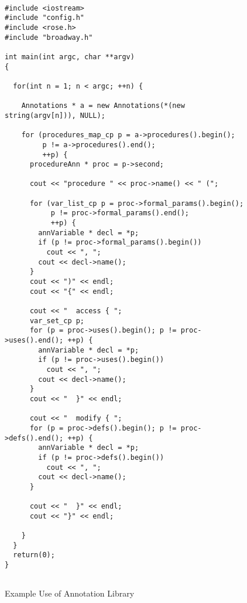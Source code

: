 \documentclass[times, 10pt]{article}
\begin{document}
\begin{figure}
\begin{verbatim}

#include <iostream> 
#include "config.h" 
#include <rose.h> 
#include "broadway.h" 
 
int main(int argc, char **argv) 
{ 
 
  for(int n = 1; n < argc; ++n) { 
 
    Annotations * a = new Annotations(*(new string(argv[n])), NULL); 
 
    for (procedures_map_cp p = a->procedures().begin(); 
         p != a->procedures().end(); 
         ++p) { 
      procedureAnn * proc = p->second; 
 
      cout << "procedure " << proc->name() << " ("; 
       
      for (var_list_cp p = proc->formal_params().begin(); 
           p != proc->formal_params().end(); 
           ++p) { 
        annVariable * decl = *p; 
        if (p != proc->formal_params().begin()) 
          cout << ", "; 
        cout << decl->name(); 
      } 
      cout << ")" << endl; 
      cout << "{" << endl; 
       
      cout << "  access { "; 
      var_set_cp p;
      for (p = proc->uses().begin(); p != proc->uses().end(); ++p) { 
        annVariable * decl = *p; 
        if (p != proc->uses().begin()) 
          cout << ", "; 
        cout << decl->name(); 
      } 
      cout << "  }" << endl; 
       
      cout << "  modify { "; 
      for (p = proc->defs().begin(); p != proc->defs().end(); ++p) { 
        annVariable * decl = *p; 
        if (p != proc->defs().begin()) 
          cout << ", "; 
        cout << decl->name(); 
      } 
       
      cout << "  }" << endl; 
      cout << "}" << endl; 
       
    } 
  } 
  return(0); 
} 
 
\end{verbatim}
\caption{Example Use of Annotation Library}
\label{figure:annuse}
\end{figure}







\end{document}
